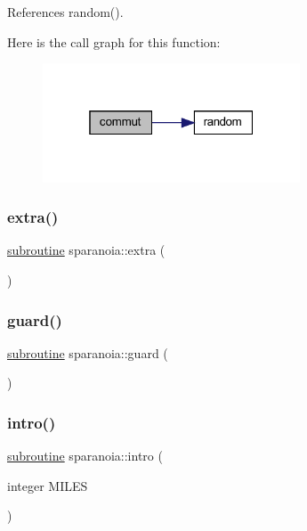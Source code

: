 References random().

Here is the call graph for this function\+:
\nopagebreak
\begin{figure}[H]
\begin{center}
\leavevmode
\includegraphics[width=217pt]{sparanoia_8f90_a2e6392c39ecf007b0ce79ffe66fbb3ea_cgraph}
\end{center}
\end{figure}
\mbox{\label{sparanoia_8f90_a420c65f09dabcda4b79dd31b732a3289}} 
\subsubsection{\texorpdfstring{extra()}{extra()}}
{\footnotesize\ttfamily \hyperlink{M__stopwatch_83_8txt_acfbcff50169d691ff02d4a123ed70482}{subroutine} sparanoia\+::extra (\begin{DoxyParamCaption}{ }\end{DoxyParamCaption})}

\mbox{\label{sparanoia_8f90_a870fdab923b08ed2d23d8f8da26c75ad}} 
\subsubsection{\texorpdfstring{guard()}{guard()}}
{\footnotesize\ttfamily \hyperlink{M__stopwatch_83_8txt_acfbcff50169d691ff02d4a123ed70482}{subroutine} sparanoia\+::guard (\begin{DoxyParamCaption}{ }\end{DoxyParamCaption})}

\mbox{\label{sparanoia_8f90_a08fb2993ab64ff8eadc9bbcdee178dfa}} 
\subsubsection{\texorpdfstring{intro()}{intro()}}
{\footnotesize\ttfamily \hyperlink{M__stopwatch_83_8txt_acfbcff50169d691ff02d4a123ed70482}{subroutine} sparanoia\+::intro (\begin{DoxyParamCaption}\item[{integer}]{M\+I\+L\+ES }\end{DoxyParamCaption})}



